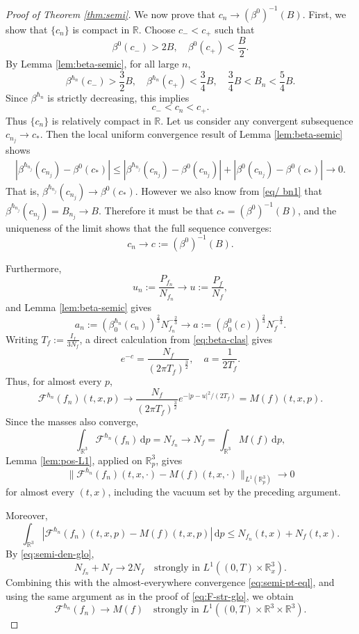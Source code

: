 \documentclass[10pt,reqno]{amsart}
\numberwithin{equation}{section}
\theoremstyle{definition}
\newcommand{\R}{\mathbb R}
\newcommand{\dpp}{\mathrm{d}p}
\newcommand{\calF}{\mathcal F}
\newcommand{\bq}{\begin{equation}}
\newcommand{\eq}{\end{equation}}
\newcommand{\lt}{\left}
\newcommand{\rt}{\right}
\begin{document}
\begin{proof}[Proof of Theorem \ref{thm:semi}]
We now prove that $c_n\to  (\beta^0)^{-1}(B)$. First, we show that $\{c_n\}$ is compact in $\R$. Choose $c_-<c_+$ such that
\[
 \beta^0(c_-)>2B,  \quad  \beta^0(c_+)<\frac{B}{2}.
\]
By Lemma \ref{lem:beta-semic}, for all large $n$,
\[
 \beta^{\hbar_n}(c_-)>\frac32B,  \quad  \beta^{\hbar_n}(c_+)<\frac34B,  \quad  \frac34B<B_n<\frac54B.
\]
Since $\beta^{\hbar_n}$ is strictly decreasing, this implies
\[
 c_-<c_n<c_+.
\]
Thus $\{c_n\}$ is relatively compact in $\R$. Let us consider any convergent subsequence $c_{n_j}\to c_*$. Then the local uniform convergence result of Lemma \ref{lem:beta-semic} shows
\begin{align*}
 |\beta^{\hbar_{n_j}}(c_{n_j}) - \beta^0(c_*)| \le |\beta^{\hbar_{n_j}}(c_{n_j}) - \beta^0(c_{n_j})| + |\beta^0(c_{n_j}) - \beta^0(c_*)| \to 0.
\end{align*}
That is, $\beta^{\hbar_{n_j}}(c_{n_j})\to \beta^0(c_*)$. However we also know from \eqref{eq/ bn1} that $\beta^{\hbar_{n_j}}(c_{n_j}) = B_{n_j} \to B$. Therefore it must be that $c_* = (\beta^0)^{-1}(B)$, and the uniqueness of the limit shows that the full sequence converges:
\[
 c_n\to c :=(\beta^0)^{-1}(B).
\]

Furthermore,
\[
 u_n:=\frac{P_{f_n}}{N_{f_n}}\to u:=\frac{P_f}{N_f},
\]
and Lemma \ref{lem:beta-semic} gives
\[
 a_n:=(\beta_0^{\hbar_n}(c_n))^{\frac23}N_{f_n}^{-\frac23}  \to a:=(\beta_0^0(c))^{\frac23}N_f^{-\frac23}.
\]
Writing $T_f:=\frac{I_f}{3N_f}$, a direct calculation from \eqref{eq:beta-clas} gives
\[
 e^{-c}=\frac{N_f}{(2\pi T_f)^{\frac32}},  \quad  a=\frac1{2T_f}.
\]
Thus, for almost every $p$,
\[
 \calF^{\hbar_n}(f_n)(t,x,p)  \to  \frac{N_f}{(2\pi T_f)^{\frac32}}  e^{-|p-u|^2/(2T_f)}  =M(f)(t,x,p).
\]
Since the masses also converge,
\[
 \int_{\R^3}\calF^{\hbar_n}(f_n)\,\dpp=N_{f_n}\to N_f=\int_{\R^3} M(f)\,\dpp,
\]
Lemma \ref{lem:pos-L1}, applied on $\R^3_p$, gives
\bq \label{eq:semi-pt-eql}
 \|\calF^{\hbar_n}(f_n)(t,x,\cdot)-M(f)(t,x,\cdot)\|_{L^1(\R^3_p)}\to0
\eq
for almost every $(t,x)$, including the vacuum set by the preceding argument.

Moreover,
\[
 \int_{\R^3}\lt|  \calF^{\hbar_n}(f_n)(t,x,p)-M(f)(t,x,p)\rt|\,\dpp  \leq  N_{f_n}(t,x)+N_f(t,x).
\]
By \eqref{eq:semi-den-glo},
\[
 N_{f_n}+N_f\to2N_f  \quad\text{strongly in }L^1((0,T)\times\R^3_x).
\]
Combining this with the almost-everywhere convergence \eqref{eq:semi-pt-eql}, and using the same argument as in the proof of \eqref{eq:F-str-glo}, we obtain
\bq \label{eq:semi-F-str}
 \calF^{\hbar_n}(f_n)\to M(f)  \quad\text{strongly in }L^1((0,T)\times\R^3\times\R^3).
\eq


\end{proof}
\end{document}
